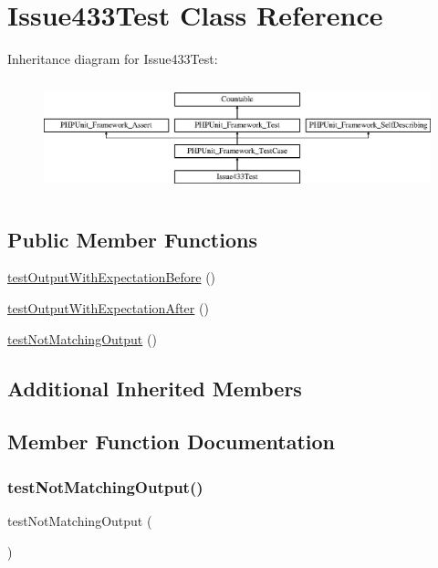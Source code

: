 \hypertarget{class_issue433_test}{}\section{Issue433\+Test Class Reference}
\label{class_issue433_test}
Inheritance diagram for Issue433\+Test\+:\begin{figure}[H]
\begin{center}
\leavevmode
\includegraphics[height=3.303835cm]{class_issue433_test}
\end{center}
\end{figure}
\subsection*{Public Member Functions}
\begin{DoxyCompactItemize}
\item 
\mbox{\hyperlink{class_issue433_test_adf7c386bf9eafdf68da61e980d940938}{test\+Output\+With\+Expectation\+Before}} ()
\item 
\mbox{\hyperlink{class_issue433_test_acaa232f0410700a492c839aae855a504}{test\+Output\+With\+Expectation\+After}} ()
\item 
\mbox{\hyperlink{class_issue433_test_a06acca02484700b576896e5db0749b4a}{test\+Not\+Matching\+Output}} ()
\end{DoxyCompactItemize}
\subsection*{Additional Inherited Members}


\subsection{Member Function Documentation}
\mbox{\label{class_issue433_test_a06acca02484700b576896e5db0749b4a}} 
\subsubsection{\texorpdfstring{test\+Not\+Matching\+Output()}{testNotMatchingOutput()}}
{\footnotesize\ttfamily test\+Not\+Matching\+Output (\begin{DoxyParamCaption}{ }\end{DoxyParamCaption})}

